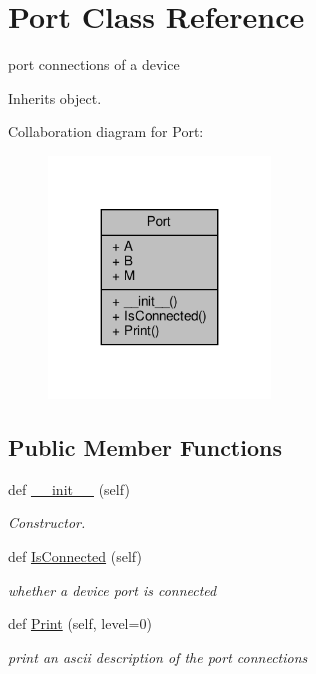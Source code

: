 \hypertarget{classSignalIntegrity_1_1SystemDescriptions_1_1Port_1_1Port}{}\section{Port Class Reference}
\label{classSignalIntegrity_1_1SystemDescriptions_1_1Port_1_1Port}


port connections of a device  




Inherits object.



Collaboration diagram for Port\+:\nopagebreak
\begin{figure}[H]
\begin{center}
\leavevmode
\includegraphics[width=167pt]{classSignalIntegrity_1_1SystemDescriptions_1_1Port_1_1Port__coll__graph}
\end{center}
\end{figure}
\subsection*{Public Member Functions}
\begin{DoxyCompactItemize}
\item 
\mbox{\label{classSignalIntegrity_1_1SystemDescriptions_1_1Port_1_1Port_ae64f0875afe3067b97ba370b354b9213}} 
def \hyperlink{classSignalIntegrity_1_1SystemDescriptions_1_1Port_1_1Port_ae64f0875afe3067b97ba370b354b9213}{\+\_\+\+\_\+init\+\_\+\+\_\+} (self)
\begin{DoxyCompactList}\small\item\em Constructor. \end{DoxyCompactList}\item 
def \hyperlink{classSignalIntegrity_1_1SystemDescriptions_1_1Port_1_1Port_a38c0724582a690c5fcc37a259ae6f97e}{Is\+Connected} (self)
\begin{DoxyCompactList}\small\item\em whether a device port is connected \end{DoxyCompactList}\item 
def \hyperlink{classSignalIntegrity_1_1SystemDescriptions_1_1Port_1_1Port_a891ce4dff358dfe4f73c3c0e269bcffd}{Print} (self, level=0)
\begin{DoxyCompactList}\small\item\em print an ascii description of the port connections \end{DoxyCompactList}\end{DoxyCompactItemize}


